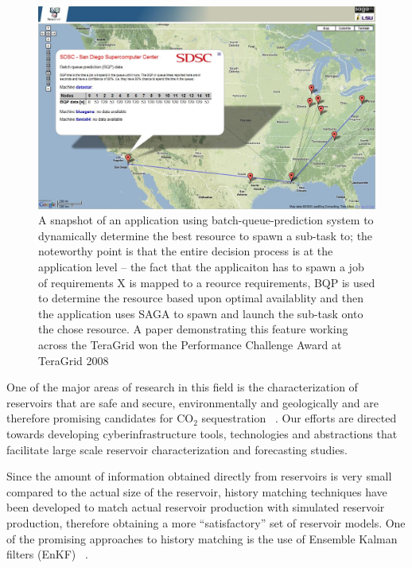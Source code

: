 \documentclass[a4paper,10pt]{article}
\begin{document}
\begin{figure}
\begin{center}
\includegraphics[scale=0.33]{gmaps_bqp.jpg}
\end{center}
\caption{A snapshot of an application using batch-queue-prediction system to dynamically determine the best resource to spawn a sub-task to; the noteworthy point is that the entire decision process is at the application level -- the fact that the applicaiton has to spawn a job of requirements X is mapped to a reource requirements, BQP is used to determine the resource based upon optimal availablity and then the application uses SAGA to spawn and launch the sub-task onto the chose resource. A paper demonstrating this feature working across the TeraGrid won the Performance Challenge Award at TeraGrid 2008}
\label{}
\end{figure}

One of the major areas of research in this field is the characterization of reservoirs that are safe and secure, environmentally and geologically and are therefore promising candidates for CO$_2$ sequestration ~\cite{GeoRPT,Luigi}. Our efforts are directed towards developing cyberinfrastructure tools, technologies and abstractions that facilitate large scale reservoir characterization and forecasting studies.

Since the amount of information obtained directly from reservoirs is very small compared to the actual size of the reservoir, history matching techniques have been developed to match actual reservoir production with simulated reservoir production, therefore obtaining a more ``satisfactory'' set of reservoir models. One of the promising approaches to history matching is the use of Ensemble Kalman filters (EnKF) ~\cite{KalmanPaper, DO2007, LiEnKF07, DO2006}.
\end{document}
